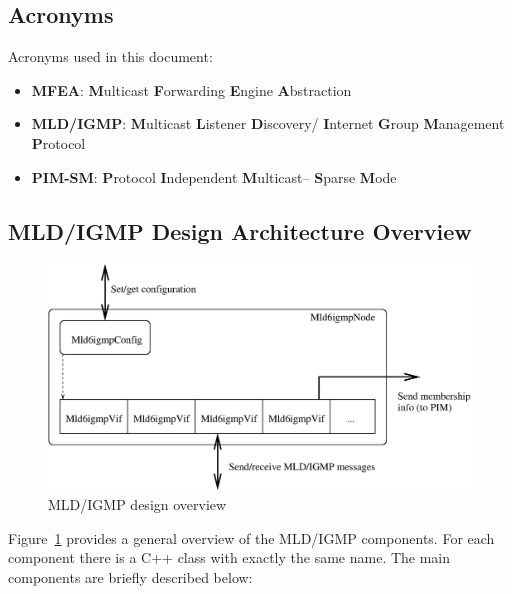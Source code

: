 \documentclass[11pt]{article}
\begin{document}
\subsection{Acronyms}

Acronyms used in this document:

\begin{itemize}

  \item {\bf MFEA}: {\bf M}ulticast {\bf F}orwarding {\bf E}ngine
  {\bf A}bstraction

  \item {\bf MLD/IGMP}: {\bf M}ulticast {\bf L}istener {\bf D}iscovery/{\bf
  I}nternet {\bf G}roup {\bf M}anagement {\bf P}rotocol

  \item {\bf PIM-SM}: {\bf P}rotocol {\bf I}ndependent {\bf M}ulticast--{\bf
  S}parse {\bf M}ode

\end{itemize}


\subsection{MLD/IGMP Design Architecture Overview}

\begin{figure}[htbp]
  \begin{center}
    \includegraphics[scale=0.7]{figs/mld6igmp_design_overview}
    \caption{MLD/IGMP design overview}
    \label{fig:mld6igmp_design_overview}
  \end{center}
\end{figure}

Figure~\ref{fig:mld6igmp_design_overview} provides a general overview of the
MLD/IGMP components. For each component there is a C++ class with exactly
the same name. The main components are briefly described below:
\end{document}
